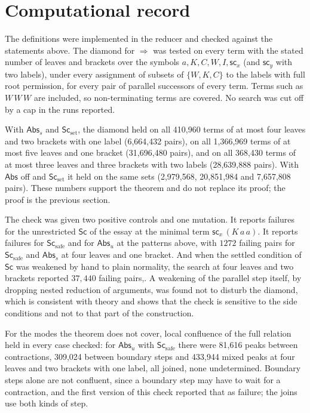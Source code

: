 \documentclass[11pt]{article}
\theoremstyle{definition}
\newcommand{\pa}{\Rightarrow}
\newcommand{\Sc}{\mathsf{Sc}}
\newcommand{\Abs}{\mathsf{Abs}}
\newcommand{\scn}[1]{\mathsf{sc}_{#1}}
\begin{document}
\section{Computational record}

The definitions were implemented in the reducer and checked against the statements above. The diamond for $\pa$ was tested on every term with the stated number of leaves and brackets over the symbols $a,K,C,W,I,\scn{x}$ (and $\scn{y}$ with two labels), under every assignment of subsets of $\{W,K,C\}$ to the labels with full root permission, for every pair of parallel successors of every term. Terms such as $W\,W\,W$ are included, so non-terminating terms are covered. No search was cut off by a cap in the runs reported.

With $\Abs_s$ and $\Sc_{\mathrm{set}}$, the diamond held on all 410{,}960 terms of at most four leaves and two brackets with one label (6{,}664{,}432 pairs), on all 1{,}366{,}969 terms of at most five leaves and one bracket (31{,}696{,}480 pairs), and on all 368{,}430 terms of at most three leaves and three brackets with two labels (28{,}639{,}888 pairs). With $\Abs$ off and $\Sc_{\mathrm{set}}$ it held on the same sets (2{,}979{,}568, 20{,}851{,}984 and 7{,}657{,}808 pairs). These numbers support the theorem and do not replace its proof; the proof is the previous section.

The check was given two positive controls and one mutation. It reports failures for the unrestricted $\Sc$ of the essay at the minimal term $\scn{x}\,(K\,a\,a)$. It reports failures for $\Sc_{\mathrm{safe}}$ and for $\Abs_u$ at the patterns above, with $1272$ failing pairs for $\Sc_{\mathrm{safe}}$ and $\Abs_s$ at four leaves and one bracket. And when the settled condition of $\Sc$ was weakened by hand to plain normality, the search at four leaves and two brackets reported $37{,}440$ failing pairs,. A weakening of the parallel step itself, by dropping nested reduction of arguments, was found not to disturb the diamond, which is consistent with theory and shows that the check is sensitive to the side conditions and not to that part of the construction.

For the modes the theorem does not cover, local confluence of the full relation held in every case checked: for $\Abs_u$ with $\Sc_{\mathrm{safe}}$ there were 81{,}616 peaks between contractions, 309{,}024 between boundary steps and 433{,}944 mixed peaks at four leaves and two brackets with one label, all joined, none undetermined. Boundary steps alone are not confluent, since a boundary step may have to wait for a contraction, and the first version of this check reported that as failure; the joins use both kinds of step.
\end{document}
